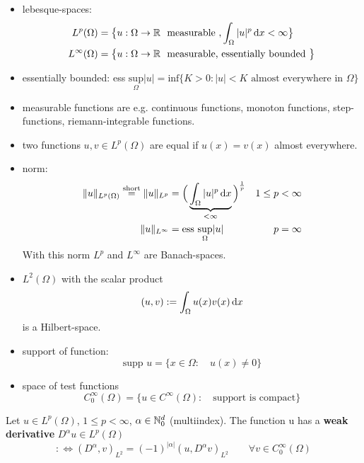 	\begin{itemize}
		\item lebesque-spaces: 
		\begin{align*}
		L^p(\Omega) &= \big\{ u: \Omega \to \mathbb{R} \ \text{ measurable } , \int_\Omega |u|^p \mathop{}\!\mathrm{d} x < \infty \big\}  \\
		L^\infty(\Omega) &= \big\{ u: \Omega \to \mathbb{R} \ \text{ measurable, essentially bounded } \big\}
		\end{align*}
		\item essentially bounded: ess $ \underset{\Omega}{\text{sup}} |u| = \text{inf}\big\{ K >0 : |u|<K \text{ almost everywhere in } \Omega \big\}  $
		
		\item measurable functions are e.g. continuous functions, monoton functions, step-functions, riemann-integrable functions.
		\item two functions $u,v \in L^p(\Omega)$ are equal if $u(x) = v(x)$ almost everywhere.
		\item norm: 
		\begin{align*}
			\|u\|_{L^p(\Omega)} \overset{\text{short}}{=}\|u\|_{L^p} &= \Big (\underbrace{ \int_\Omega |u|^p \mathop{}\!\mathrm{d} x}_{ < \infty} \Big )^{\frac{1}{p} } & 1 \leq p&<\infty \\
		\|u\|_{L^\infty} &= \text{ess }\underset{\Omega}{\text{sup}} |u| & p&= \infty 
		\end{align*}
		With this norm $L^p$ and $L^\infty$ are Banach-spaces.
		\item $L^2(\Omega)$ with the scalar product
		\begin{equation*}
		(u,v) := \int_\Omega u(x)v(x) \mathop{}\!\mathrm{d} x 
		\end{equation*}
		is a Hilbert-space.
		\item support of function:
		\begin{equation*}
		\text{supp }u  = \big \{ x \in \Omega:\quad u(x)\neq0  \big \} 
		\end{equation*}
		\item space of test functions
		\begin{equation*}
		C^\infty_0(\Omega) = \big \{ u \in C^\infty(\Omega):\quad \text{support is compact}  \big\}
		\end{equation*}
	\end{itemize}



\begin{defi}
Let $ u \in L^p(\Omega)$, $1 \leq p< \infty$, $\alpha \in \mathbb{N}^d_0$ (multiindex).\enter
The function u has a \textbf{weak derivative} $ D^\alpha u \in L^p(\Omega) $ 
\begin{equation*}
	:\iff (D^\alpha,v)_{L^2} = (-1)^{|\alpha|} (u,D^\alpha v)_{L^2} \qquad \forall v \in C^\infty_0(\Omega)
\end{equation*}
\end{defi}

